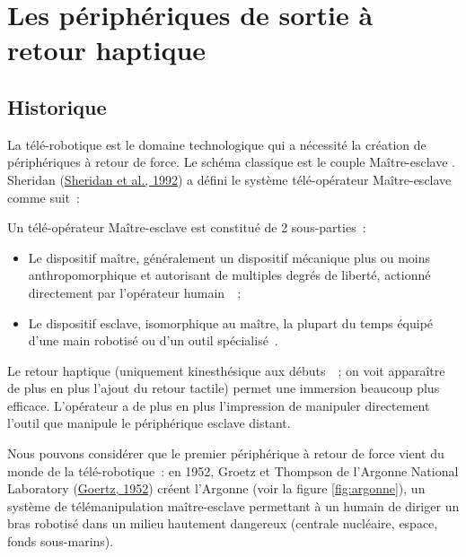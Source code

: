 \documentclass[
]{book}
\providecommand{\tightlist}{%
  \setlength{\itemsep}{0pt}\setlength{\parskip}{0pt}}
\begin{document}
\hypertarget{les-puxe9riphuxe9riques-de-sortie-uxe0-retour-haptique}{%
\section{Les périphériques de sortie à retour haptique}\label{les-puxe9riphuxe9riques-de-sortie-uxe0-retour-haptique}}

\hypertarget{historique}{%
\subsection{Historique}\label{historique}}

La télé-robotique est le domaine technologique qui a nécessité la création
de périphériques à retour de force. Le schéma classique est le couple
Maître-esclave . Sheridan (\protect\hyperlink{ref-sheridan1992musings}{Sheridan et al., 1992}) a défini le système
télé-opérateur Maître-esclave comme suit~:

Un télé-opérateur Maître-esclave est constitué de 2
sous-parties~:

\begin{itemize}
\tightlist
\item
  Le dispositif maître, généralement un dispositif
  mécanique plus ou moins anthropomorphique et autorisant de multiples degrés
  de liberté, actionné directement par l'opérateur humain~~;
\item
  Le dispositif esclave, isomorphique au maître, la
  plupart du temps équipé d'une main robotisé ou d'un outil
  spécialisé~.
\end{itemize}

Le retour haptique (uniquement kinesthésique aux débuts~~; on voit
apparaître de plus en plus l'ajout du retour tactile) permet une immersion
beaucoup plus efficace. L'opérateur a de plus en plus l'impression de
manipuler directement l'outil que manipule le périphérique esclave
distant.

Nous pouvons considérer que le premier périphérique à retour de force
vient du monde de la télé-robotique~: en 1952, Groetz et Thompson de l'Argonne
National Laboratory (\protect\hyperlink{ref-goertz1952fundamentals}{Goertz, 1952}) créent
l'Argonne (voir la figure \ref{fig:argonne}), un système
de télémanipulation maître-esclave permettant à un humain de diriger un bras
robotisé dans un milieu hautement dangereux (centrale nucléaire, espace,
fonds sous-marins).
\end{document}
